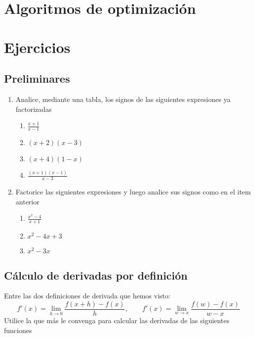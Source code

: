 \section{Algoritmos de optimización} \label{svc:sec:opti}

\section{Ejercicios}

\subsection{Preliminares}

\begin{enumerate}

    \item Analice, mediante una tabla, los signos de las siguientes expresiones ya factorizadas

    \begin{enumerate}
        \item $\frac{x + 1}{x - 1}$
        \item $(x + 2)(x - 3)$
        \item $(x + 4)(1 - x)$
        \item $\frac{(x + 1)(x - 1)}{x-3}$
    \end{enumerate}

    \item Factorice las siguientes expresiones y luego analice sus signos como en el item anterior
    
    \begin{enumerate}
        \item $\frac{x^2 - 4}{x + 1}$
        \item $x^2 - 4x + 3$
        \item $x^2 - 3x$
    \end{enumerate}

\end{enumerate}

\subsection{Cálculo de derivadas por definición}

Entre las dos definiciones de derivada que hemos visto:
\[f'(x) = \lim_{h \to 0} \frac{f(x + h) - f(x)}{h}, \qquad f'(x) = \lim_{w \to x} \frac{f(w) - f(x)}{w - x}\]
Utilice la que más le convenga para calcular las derivadas de las siguientes funciones

